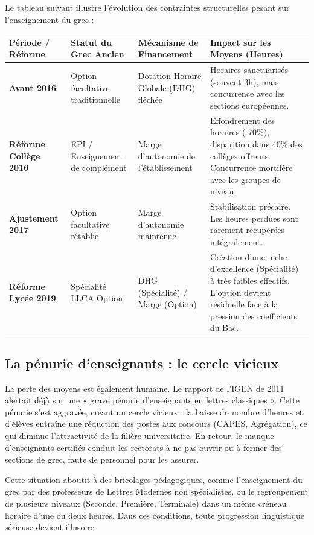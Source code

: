 Le tableau suivant illustre l'évolution des contraintes structurelles pesant sur l'enseignement du
grec :

\begin{table}[h!]\small\centering\begin{tabular}{| p{2cm} | p{2.2cm} | p{2.2cm} | p{2.2cm} |}\hline\textbf{Période / Réforme} & \textbf{Statut du Grec Ancien} & \textbf{Mécanisme de Financement} & \textbf{Impact sur les Moyens (Heures)} \\ \hline\textbf{Avant 2016} & Option facultative traditionnelle & Dotation Horaire Globale (DHG) fléchée & Horaires sanctuarisés (souvent 3h), mais concurrence avec les sections européennes. \\ \hline\textbf{Réforme Collège 2016} & EPI / Enseignement de complément & Marge d'autonomie de l'établissement & Effondrement des horaires (-70\%), disparition dans 40\% des collèges offreurs.\cite{I-3-3-ref3} Concurrence mortifère avec les groupes de niveau. \\ \hline\textbf{Ajustement 2017} & Option facultative rétablie & Marge d'autonomie maintenue & Stabilisation précaire. Les heures perdues sont rarement récupérées intégralement.\cite{I-3-3-ref2} \\ \hline\textbf{Réforme Lycée 2019} & Spécialité LLCA \+ Option & DHG (Spécialité) / Marge (Option) & Création d'une niche d'excellence (Spécialité) à très faibles effectifs. L'option devient résiduelle face à la pression des coefficients du Bac.\cite{I-3-3-ref6} \\ \hline\end{tabular}\end{table}

\subsection{La pénurie d'enseignants : le cercle vicieux}

La perte des moyens est également humaine. Le rapport de l'IGEN de 2011 alertait déjà sur une «
grave pénurie d’enseignants en lettres classiques ».\cite{I-3-3-ref1} Cette pénurie s'est aggravée,
créant un cercle vicieux : la baisse du nombre d'heures et d'élèves entraîne une réduction des
postes aux concours (CAPES, Agrégation), ce qui diminue l'attractivité de la filière universitaire.
En retour, le manque d'enseignants certifiés conduit les rectorats à ne pas ouvrir ou à fermer des
sections de grec, faute de personnel pour les assurer.\cite{I-3-3-ref1}

Cette situation aboutit à des bricolages pédagogiques, comme l'enseignement du grec par des
professeurs de Lettres Modernes non spécialistes, ou le regroupement de plusieurs niveaux (Seconde,
Première, Terminale) dans un même créneau horaire d'une ou deux heures.\cite{I-3-3-ref1} Dans ces
conditions, toute progression linguistique sérieuse devient illusoire.




